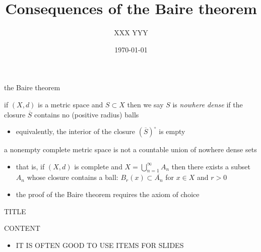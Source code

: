 \documentclass[10pt,hyperref]{beamer}
\title{Consequences of the Baire theorem}  %
\author{XXX YYY}  %
\date{\today}  %
\begin{document}
\beamertemplatenavigationsymbolsempty  %

\begin{frame}
  \maketitle
\end{frame}


\begin{frame}{the Baire theorem}

\begin{definition}
if $(X,d)$ is a metric space and $S \subset X$ then we say $S$ is \emph{nowhere dense} if the closure $\overline{S}$ contains no (positive radius) balls
\end{definition}

\begin{itemize}
\item equivalently, the interior of the closure ${(\overline{S})}^\circ$ is empty
\end{itemize}

\begin{theorem}[Baire 1899]
a nonempty complete metric space is not a countable union of nowhere dense sets
\end{theorem}

\begin{itemize}
\item that is, if $(X,d)$ is complete and $X=\bigcup_{n=1}^\infty A_n$ then there exists a subset $A_n$ whose closure contains a ball: \quad $B_r(x) \subset \overline{A_n}$ for $x\in X$ and $r>0$
\item the proof of the Baire theorem requires the axiom of choice
\end{itemize}
\end{frame}


\begin{frame}{TITLE}

CONTENT

\begin{itemize}
\item IT IS OFTEN GOOD TO USE ITEMS FOR SLIDES
\end{itemize}

\end{frame}
\end{document}
